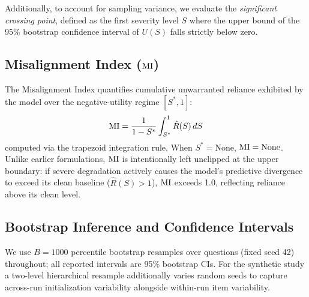 Additionally, to account for sampling variance, we evaluate the \emph{significant crossing point}, defined as the first severity level $S$ where the upper bound of the 95\% bootstrap confidence interval of $U(S)$ falls strictly below zero.

\subsection{Misalignment Index ($\text{MI}$)}
The Misalignment Index quantifies cumulative unwarranted reliance exhibited by the model over the negative-utility regime $[S^*, 1]$:
\begin{equation}
\text{MI} = \frac{1}{1 - S^*} \int_{S^*}^1 \hat{R}(S) \, dS
\end{equation}
computed via the trapezoid integration rule. When $S^* = \text{None}$, $\text{MI} = \text{None}$.
Unlike earlier formulations, $\text{MI}$ is intentionally left unclipped at the upper boundary: if severe degradation actively causes the model's predictive divergence to exceed its clean baseline ($\hat{R}(S) > 1$), $\text{MI}$ exceeds 1.0, reflecting reliance above its clean level.

\subsection{Bootstrap Inference and Confidence Intervals}
We use $B=1000$ percentile bootstrap resamples over questions (fixed seed 42) throughout; all reported intervals are 95\% bootstrap CIs. For the synthetic study a two-level hierarchical resample additionally varies random seeds to capture across-run initialization variability alongside within-run item variability.
